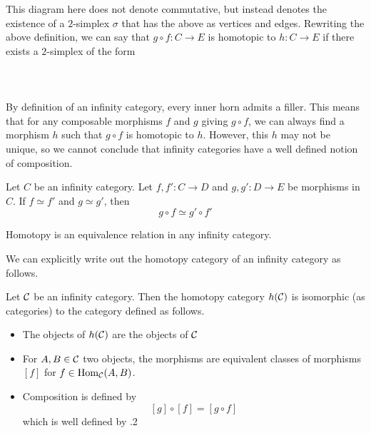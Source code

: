 \documentclass[a4paper]{article}
\begin{document}
This diagram here does not denote commutative, but instead denotes the existence of a $2$-simplex $\sigma$ that has the above as vertices and edges. Rewriting the above definition, we can say that $g\circ f:C\to E$ is homotopic to $h:C\to E$ if there exists a $2$-simplex of the form \\~\\
\\~\\
By definition of an infinity category, every inner horn admits a filler. This means that for any composable morphisms $f$ and $g$ giving $g\circ f$, we can always find a morphism $h$ such that $g\circ f$ is homotopic to $h$. However, this $h$ may not be unique, so we cannot conclude that infinity categories have a well defined notion of composition. 

\begin{prp}{}{} Let $C$ be an infinity category. Let $f,f':C\to D$ and $g,g':D\to E$ be morphisms in $C$. If $f\simeq f'$ and $g\simeq g'$, then $$g\circ f\simeq g'\circ f'$$
\end{prp}

\begin{lmm}{}{} Homotopy is an equivalence relation in any infinity category. 
\end{lmm}

We can explicitly write out the homotopy category of an infinity category as follows. 

\begin{prp}{}{} Let $\mathcal{C}$ be an infinity category. Then the homotopy category $h(\mathcal{C})$ is isomorphic (as categories) to the category defined as follows. 
\begin{itemize}
\item The objects of $h(\mathcal{C})$ are the objects of $\mathcal{C}$
\item For $A,B\in\mathcal{C}$ two objects, the morphisms are equivalent classes of morphisms $[f]$ for $f\in\operatorname{Hom}_{\mathcal{C}}(A,B)$. 
\item Composition is defined by $$[g]\circ[f]=[g\circ f]$$ which is well defined by .2
\end{itemize}
\end{prp}
\end{document}

